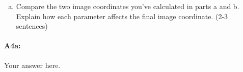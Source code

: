 \begin{enumerate} [(a)]
\begin{enumerate} [(i)]
\item A camera with focal length in both $x$ and $y$ directions of $2$, a translation of $5$ along the x-axis, and no skew or rotation.
\vspace{-0.3cm}
\begin{align}
    \begin{pmatrix} 
    \_\_ & \_\_ & $0$ \\ 
    $0$ & \_\_ & $0$ \\ 
    $0$ & $0$ & $1$ \end{pmatrix} *
    \begin{pmatrix} 
    \_\_ & \_\_ & \_\_ & \_\_ \\ 
    \_\_ & \_\_ & \_\_ & \_\_ \\ 
    \_\_ & \_\_ & \_\_ & \_\_ \end{pmatrix} * 
    \begin{pmatrix} 
    $30$ \\ 
    $-20$ \\ 
    $10$ \\ 
    $1$ \end{pmatrix}
    = \begin{pmatrix}  \_\_ \\ \_\_ \\ \_\_ \end{pmatrix}
    = \_\_ * \begin{pmatrix}  \_\_ \\ \_\_ \\ $1$ \end{pmatrix}
\end{align}

\end{enumerate}
\item Compare the two image coordinates you've calculated in parts a and b. Explain how each parameter affects the final image coordinate. (2-3 sentences)


\end{enumerate}

\paragraph{A4a:} Your answer here.




